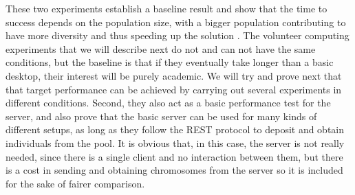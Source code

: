 \documentclass[journal,onecolumn]{IEEEtran}
\begin{document}
These two experiments establish a baseline result and show that
the time to success depends on the population size, with a bigger population
contributing to have more diversity and thus speeding up the solution \cite{DBLP:conf/lion/LaredoDFGB13}. The volunteer computing
experiments that we will describe next do not and can not have the
same conditions, but
the baseline is that if they eventually take longer than a basic
desktop, their interest will be purely academic. We will try and
prove next that that target performance can be achieved by carrying
out several experiments in different conditions. Second, they also act
as a basic performance test for the server, and also prove that the
basic server can be used for many kinds of different setups, as long
as they follow the REST protocol to deposit and obtain individuals
from the pool. It is obvious that, in this case, the server is not
really needed, since there is a single client and no interaction
between them, but there is a cost in sending and obtaining chromosomes
from the server so it is included for the sake of fairer comparison.
\end{document}
